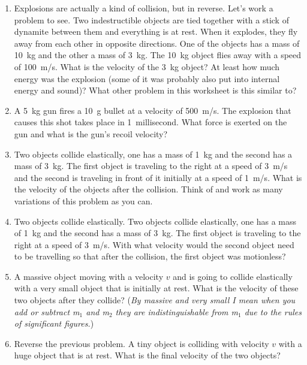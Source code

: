 \begin{enumerate}
\item Explosions are actually a kind of collision, but in reverse. Let's work a problem to see. Two indestructible objects are tied together with a stick of dynamite between them and everything is at rest. When it explodes, they fly away from each other in opposite directions. One of the objects has a mass of \SI{10}{kg} and the other a mass of \SI{3}{kg}. The \SI{10}{kg} object flies away with a speed of \SI{100}{m/s}. What is the velocity of the \SI{3}{kg} object? At least how much energy was the explosion (some of it was probably also put into internal energy and sound)? What other problem in this worksheet is this similar to?


\item A \SI{5}{kg} gun fires a \SI{10}{\gram} bullet at a velocity of \SI{500}{m/s}. The explosion that causes this shot takes place in \SI{1}{millisecond}. What force is exerted on the gun and what is the gun's recoil velocity?

\item Two objects collide elastically, one has a mass of \SI{1}{kg} and the second has a mass of \SI{3}{kg}. The first object is traveling to the right at a speed of \SI{3}{m/s} and the second is traveling in front of it initially at a speed of \SI{1}{m/s}. What is the velocity of the objects after the collision. Think of and work as many variations of this problem as you can.
\giantskip

\item Two objects collide elastically. Two objects collide elastically, one has a mass of \SI{1}{kg} and the second has a mass of \SI{3}{kg}. The first object is traveling to the right at a speed of \SI{3}{m/s}. With what velocity would the second object need to be travelling so that after the collision, the first object was motionless?


\item
A massive object moving with a velocity $v$ and is going to collide elastically with a very small object that is initially at rest. What is the velocity of these two objects after they collide? (\emph{By massive and very small I mean when you add or subtract m$_1$ and m$_2$ they are indistinguishable from m$_1$ due to the rules of significant figures.})

\item 
Reverse the previous problem. A tiny object is colliding with velocity $v$ with a huge object that is at rest. What is the final velocity of the two objects?


\end{enumerate}
